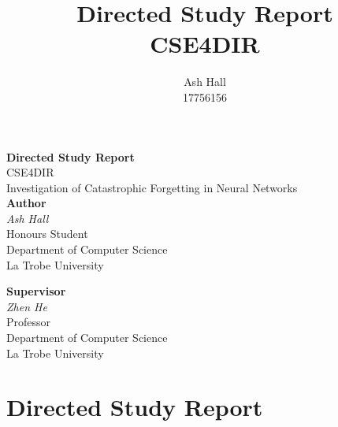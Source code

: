\documentclass{report}
\title{Directed Study Report\\CSE4DIR}
\author{Ash Hall\\17756156}
\begin{document}
	\begin{titlepage}
		\begin{center}
			\vspace*{5cm}


			{\huge \textbf{Directed Study Report}} \\
			\vspace{0.1cm}
			{\Large CSE4DIR} \\
			\vspace{0.3cm}
			{\large Investigation of Catastrophic Forgetting in Neural Networks} \\
			\vspace*{2cm}
			\textbf{Author} \\
			\textit{Ash Hall} \\
			Honours Student \\
			Department of Computer Science \\
			La Trobe University \\		
			\vspace{0.75cm}
			
			\textbf{Supervisor} \\
			\textit{Zhen He} \\
			Professor \\
			Department of Computer Science \\
			La Trobe University \\
			
			
			\vfill
		\end{center}
	\end{titlepage}
	\thispagestyle{empty}
	\newpage
	\thispagestyle{empty}
	\tableofcontents
	\thispagestyle{empty}
	\listoffigures
	\newpage
	\thispagestyle{empty}
	\newpage
	
	\setcounter{chapter}{1}	
	\chapter*{Directed Study Report}
\end{document}
